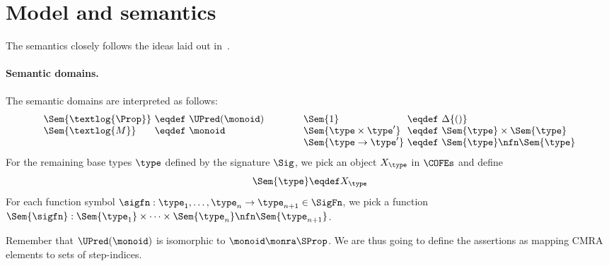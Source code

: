 \section{Model and semantics}
\label{sec:model}

The semantics closely follows the ideas laid out in~\cite{catlogic}.

\paragraph{Semantic domains.}

The semantic  domains are interpreted as follows:
\[
\begin{array}[t]{@{}l@{\ }c@{\ }l@{}}
\Sem{\textlog{\Prop}} &\eqdef& \UPred(\monoid)  \\
\Sem{\textlog{M}} &\eqdef& \monoid
\end{array}
\qquad\qquad
\begin{array}[t]{@{}l@{\ }c@{\ }l@{}}
\Sem{1} &\eqdef& \Delta \{ () \} \\
\Sem{\type \times \type'} &\eqdef& \Sem{\type} \times \Sem{\type} \\
\Sem{\type \to \type'} &\eqdef& \Sem{\type} \nfn \Sem{\type} \\
\end{array}
\]
For the remaining base types $\type$ defined by the signature $\Sig$, we pick an object $X_\type$ in $\COFEs$ and define
\[
\Sem{\type} \eqdef X_\type
\]
For each function symbol $\sigfn : \type_1, \dots, \type_n \to \type_{n+1} \in \SigFn$, we pick a function $\Sem{\sigfn} : \Sem{\type_1} \times \dots \times \Sem{\type_n} \nfn \Sem{\type_{n+1}}$.


Remember that $\UPred(\monoid)$ is isomorphic to $\monoid \monra \SProp$.
We are thus going to define the assertions as mapping CMRA elements to sets of step-indices.

